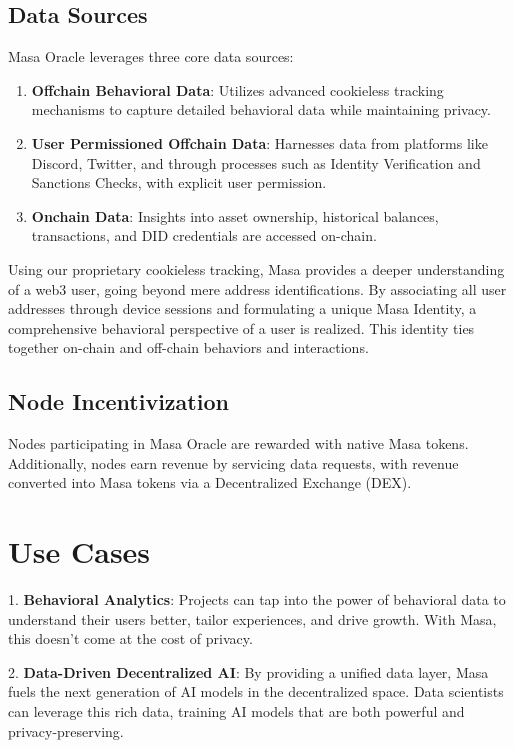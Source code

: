 \documentclass{article}
\begin{document}
\subsection{Data Sources}

Masa Oracle leverages three core data sources:
\begin{enumerate}
    \item \textbf{Offchain Behavioral Data}: Utilizes advanced cookieless tracking mechanisms to capture detailed behavioral data while maintaining privacy.
    \item \textbf{User Permissioned Offchain Data}: Harnesses data from platforms like Discord, Twitter, and through processes such as Identity Verification and Sanctions Checks, with explicit user permission.
    \item \textbf{Onchain Data}: Insights into asset ownership, historical balances, transactions, and DID credentials are accessed on-chain.
\end{enumerate}

Using our proprietary cookieless tracking, Masa provides a deeper understanding of a web3 user, going beyond mere address identifications. By associating all user addresses through device sessions and formulating a unique Masa Identity, a comprehensive behavioral perspective of a user is realized. This identity ties together on-chain and off-chain behaviors and interactions.

\subsection{Node Incentivization}

Nodes participating in Masa Oracle are rewarded with native Masa tokens. Additionally, nodes earn revenue by servicing data requests, with revenue converted into Masa tokens via a Decentralized Exchange (DEX).

\section{Use Cases}

1. \textbf{Behavioral Analytics}: Projects can tap into the power of behavioral data to understand their users better, tailor experiences, and drive growth. With Masa, this doesn't come at the cost of privacy.

2. \textbf{Data-Driven Decentralized AI}: By providing a unified data layer, Masa fuels the next generation of AI models in the decentralized space. Data scientists can leverage this rich data, training AI models that are both powerful and privacy-preserving.
\end{document}
